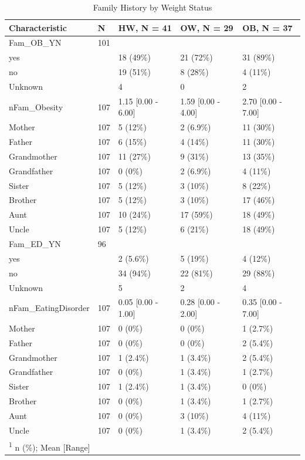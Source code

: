 \documentclass[
]{article}
\begin{document}
\begin{table}[!h]

\caption{\label{tab:Fam_OB_tab}Family History by Weight Status}
\centering
\begin{tabular}[t]{lllll}
\toprule
Characteristic & N & HW, N = 41 & OW, N = 29 & OB, N = 37\\
\midrule
Fam\_OB\_YN & 101 &  &  & \\
\hspace{1em}yes &  & 18 (49\%) & 21 (72\%) & 31 (89\%)\\
\hspace{1em}no &  & 19 (51\%) & 8 (28\%) & 4 (11\%)\\
\hspace{1em}Unknown &  & 4 & 0 & 2\\
nFam\_Obesity & 107 & 1.15 [0.00 - 6.00] & 1.59 [0.00 - 4.00] & 2.70 [0.00 - 7.00]\\
\addlinespace
Mother & 107 & 5 (12\%) & 2 (6.9\%) & 11 (30\%)\\
Father & 107 & 6 (15\%) & 4 (14\%) & 11 (30\%)\\
Grandmother & 107 & 11 (27\%) & 9 (31\%) & 13 (35\%)\\
Grandfather & 107 & 0 (0\%) & 2 (6.9\%) & 4 (11\%)\\
Sister & 107 & 5 (12\%) & 3 (10\%) & 8 (22\%)\\
\addlinespace
Brother & 107 & 5 (12\%) & 3 (10\%) & 17 (46\%)\\
Aunt & 107 & 10 (24\%) & 17 (59\%) & 18 (49\%)\\
Uncle & 107 & 5 (12\%) & 6 (21\%) & 18 (49\%)\\
Fam\_ED\_YN & 96 &  &  & \\
\hspace{1em}yes &  & 2 (5.6\%) & 5 (19\%) & 4 (12\%)\\
\addlinespace
\hspace{1em}no &  & 34 (94\%) & 22 (81\%) & 29 (88\%)\\
\hspace{1em}Unknown &  & 5 & 2 & 4\\
nFam\_EatingDisorder & 107 & 0.05 [0.00 - 1.00] & 0.28 [0.00 - 2.00] & 0.35 [0.00 - 7.00]\\
Mother & 107 & 0 (0\%) & 0 (0\%) & 1 (2.7\%)\\
Father & 107 & 0 (0\%) & 0 (0\%) & 2 (5.4\%)\\
\addlinespace
Grandmother & 107 & 1 (2.4\%) & 1 (3.4\%) & 2 (5.4\%)\\
Grandfather & 107 & 0 (0\%) & 1 (3.4\%) & 1 (2.7\%)\\
Sister & 107 & 1 (2.4\%) & 1 (3.4\%) & 0 (0\%)\\
Brother & 107 & 0 (0\%) & 1 (3.4\%) & 1 (2.7\%)\\
Aunt & 107 & 0 (0\%) & 3 (10\%) & 4 (11\%)\\
\addlinespace
Uncle & 107 & 0 (0\%) & 1 (3.4\%) & 2 (5.4\%)\\
\bottomrule
\multicolumn{5}{l}{\rule{0pt}{1em}\textsuperscript{1} n (\%); Mean [Range]}\\
\end{tabular}
\end{table}
\end{document}
